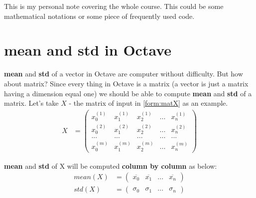 This is my personal note covering the whole course. This could be some mathematical notations or some piece of frequently used code. 
\section{\textbf{mean} and \textbf{std} in Octave}
\textbf{mean} and \textbf{std} of a vector in Octave are computer without difficulty. But how about matrix? Since every thing in Octave is a matrix (a vector is just a matrix having a dimension equal one) we should be able to compute \textbf{mean} and \textbf{std} of a matrix. Let's take $X$ - the matrix of input in \eqref{form:matX} as an example.
\begin{align*}
X &= \begin{pmatrix}
x_0^{(1)} & x_1^{(1)} & x_2^{(1)} & ... & x_n^{(1)} \\
x_0^{(2)} & x_1^{(2)} & x_2^{(2)} & ... & x_n^{(2)} \\
...       & ...       & ...       & ... & ...\\
x_0^{(m)} & x_1^{(m)} & x_2^{(m)} & ... & x_n^{(m)}
\end{pmatrix}
\end{align*}

\textbf{mean} and \textbf{std} of X will be computed \textbf{column by column} as below:
\begin{align}
mean(X) &= \begin{pmatrix}
\overline{x_0} & \overline{x_1} & ... & \overline{x_n}
\end{pmatrix} \nonumber \\
std(X) &= \begin{pmatrix}
\sigma_0 & \sigma_1 & ... & \sigma_n
\end{pmatrix}
\end{align}
